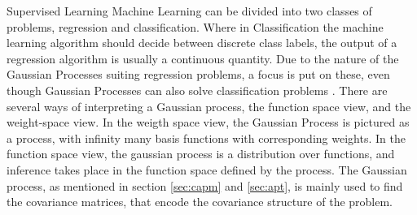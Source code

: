 Supervised Learning Machine Learning can be divided into two classes of problems, regression and classification. Where in Classification the machine learning algorithm should decide between discrete class labels, the output of a regression algorithm is usually a continuous quantity. Due to the nature of the Gaussian Processes suiting regression problems, a focus is put on these, even though Gaussian Processes can also solve classification problems \cite{Rasmussen_06}. There are several ways of interpreting a Gaussian process, the function space view, and the weight-space view. In the weigth space view, the Gaussian Process is pictured as a process, with infinity many basis functions with corresponding weights. In the function space view, the gaussian process is a distribution over functions, and inference takes place in the function space defined by the process. The Gaussian process, as mentioned in section \ref{sec:capm} and \ref{sec:apt}, is mainly used to find the covariance matrices, that encode the covariance structure of the problem. 

